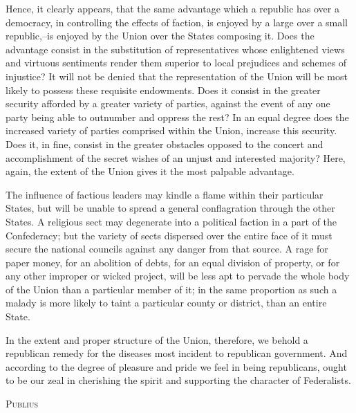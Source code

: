 Hence, it clearly appears, that the same advantage which a republic has over a democracy, in controlling the effects of faction, is enjoyed by a large over a small republic,--is enjoyed by the Union over the States composing it. Does the advantage consist in the substitution of representatives whose enlightened views and virtuous sentiments render them superior to local prejudices and schemes of injustice? It will not be denied that the representation of the Union will be most likely to possess these requisite endowments. Does it consist in the greater security afforded by a greater variety of parties, against the event of any one party being able to outnumber and oppress the rest? In an equal degree does the increased variety of parties comprised within the Union, increase this security. Does it, in fine, consist in the greater obstacles opposed to the concert and accomplishment of the secret wishes of an unjust and interested majority? Here, again, the extent of the Union gives it the most palpable advantage.

The influence of factious leaders may kindle a flame within their particular States, but will be unable to spread a general conflagration through the other States. A religious sect may degenerate into a political faction in a part of the Confederacy; but the variety of sects dispersed over the entire face of it must secure the national councils against any danger from that source. A rage for paper money, for an abolition of debts, for an equal division of property, or for any other improper or wicked project, will be less apt to pervade the whole body of the Union than a particular member of it; in the same proportion as such a malady is more likely to taint a particular county or district, than an entire State.

In the extent and proper structure of the Union, therefore, we behold a republican remedy for the diseases most incident to republican government. And according to the degree of pleasure and pride we feel in being republicans, ought to be our zeal in cherishing the spirit and supporting the character of Federalists.

\vspace{.5cm}
\textsc{Publius}
